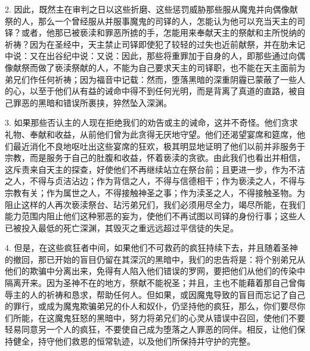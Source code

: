 2. 因此，既然主在审判之日以这些折磨、这些惩罚威胁那些服从魔鬼并向偶像献祭的人，那么一个曾经服从并服事魔鬼的司铎的人，怎能认为他可以充当天主的司铎？或者，他那已被亵渎和罪恶所掳的手，怎能用来奉献天主的祭献和主所悦纳的祈祷？因为在圣经中，天主禁止司铎即使犯了较轻的过失也近前献祭，并在肋未记中说：又在出谷纪中说：又说：因此，那些将重罪加于自身的人，即那些通过向偶像献祭而做了亵渎祭献的人，不能为自己要求天主的司铎职，也不能在天主面前为弟兄们作任何祈祷；因为福音中记载：然而，堕落黑暗的深重阴霾已蒙蔽了一些人的心，以至于他们从有益的诫命中得不到任何光明，而是背离了真道的直路，被自己罪恶的黑暗和错误所裹挟，猝然坠入深渊。\par

3. 如果那些否认主的人现在拒绝我们的劝告或主的诫命，这并不奇怪。他们贪求礼物、奉献和收益，从前他们曾为此贪得无厌地守望。他们还渴望宴席和筵席，他们最近消化不良地呕吐出这些宴席的狂欢，极其明显地证明了他们以前并非服务于宗教，而是服务于自己的肚腹和收益，怀着亵渎的贪欲。由此我们也看出并相信，这斥责来自天主的探查，好使他们不再继续站立在祭台前；且更进一步，作为不洁之人，不得与贞洁沾边；作为背信之人，不得与信德相干；作为亵渎之人，不得与宗教有关；作为属世之人，不得接触神圣之事；作为渎圣之人，不得接触圣物。为阻止这样的人再次亵渎祭台、玷污弟兄们，我们必须用尽全力，竭尽所能，在我们能力范围内阻止他们这种邪恶的妄为，使他们不再试图以司铎的身份行事；这些人已被投入最低的死亡深渊，其毁灭之重远远超过平信徒的失足。\par

4. 但是，在这些疯狂者中间，如果他们不可救药的疯狂持续下去，并且随着圣神的撤回，那已开始的盲目仍留在其深沉的黑暗中，我们的忠告将是：将个别弟兄从他们的欺骗中分离出来，免得有人陷入他们错误的罗网，要把他们从他们的传染中隔离开来。因为圣神不在的地方，祭献不能祝圣；并且，主也不能藉着那自己曾侮辱主的人的祈祷和恳求，帮助任何人。但如果，或因魔鬼导致的盲目而忘记了自己的罪行，或成为魔鬼欺骗弟兄的仆人和奴仆，仍坚持他的疯狂，那么，你们要尽你们所能，在这魔鬼狂怒的黑暗中，努力将弟兄们的心灵从错误中召回，使他们不要轻易同意另一个人的疯狂，不要使自己成为堕落之人罪恶的同伴。相反，让他们保持健全，持守他们救恩的恒常轨迹，以及他们所保持并守护的完整。\par

